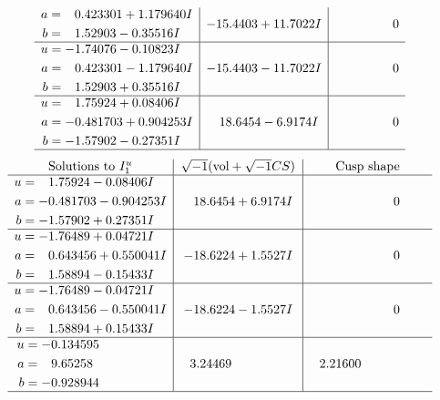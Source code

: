 \documentclass[1p]{elsarticle_modified}
\theoremstyle{definition}
\newcommand{\I}{\sqrt{-1}}
\begin{document}
$$\begin{array}{c|c|c}
\begin{aligned}
a &= \phantom{-}0.423301 + 1.179640 I \\
b &= \phantom{-}1.52903 - 0.35516 I\end{aligned}
 & -15.4403 + 11.7022 I & \phantom{-0.000000 } 0 \\ \hline\begin{aligned}
u &= -1.74076 - 0.10823 I \\
a &= \phantom{-}0.423301 - 1.179640 I \\
b &= \phantom{-}1.52903 + 0.35516 I\end{aligned}
 & -15.4403 - 11.7022 I & \phantom{-0.000000 } 0 \\ \hline\begin{aligned}
u &= \phantom{-}1.75924 + 0.08406 I \\
a &= -0.481703 + 0.904253 I \\
b &= -1.57902 - 0.27351 I\end{aligned}
 & \phantom{-}18.6454 - 6.9174 I & \phantom{-0.000000 } 0\\
 \hline 
 \end{array}$$\newpage$$\begin{array}{c|c|c}  
\text{Solutions to }I^u_{1}& \I (\text{vol} + \sqrt{-1}CS) & \text{Cusp shape}\\
 \hline 
\begin{aligned}
u &= \phantom{-}1.75924 - 0.08406 I \\
a &= -0.481703 - 0.904253 I \\
b &= -1.57902 + 0.27351 I\end{aligned}
 & \phantom{-}18.6454 + 6.9174 I & \phantom{-0.000000 } 0 \\ \hline\begin{aligned}
u &= -1.76489 + 0.04721 I \\
a &= \phantom{-}0.643456 + 0.550041 I \\
b &= \phantom{-}1.58894 - 0.15433 I\end{aligned}
 & -18.6224 + 1.5527 I & \phantom{-0.000000 } 0 \\ \hline\begin{aligned}
u &= -1.76489 - 0.04721 I \\
a &= \phantom{-}0.643456 - 0.550041 I \\
b &= \phantom{-}1.58894 + 0.15433 I\end{aligned}
 & -18.6224 - 1.5527 I & \phantom{-0.000000 } 0 \\ \hline\begin{aligned}
u &= -0.134595\phantom{ +0.000000I} \\
a &= \phantom{-}9.65258\phantom{ +0.000000I} \\
b &= -0.928944\phantom{ +0.000000I}\end{aligned}
 & \phantom{-}3.24469\phantom{ +0.000000I} & \phantom{-}2.21600\phantom{ +0.000000I}\\
 \hline 
 \end{array}$$\newpage\newpage\renewcommand{\arraystretch}{1}
\end{document}
